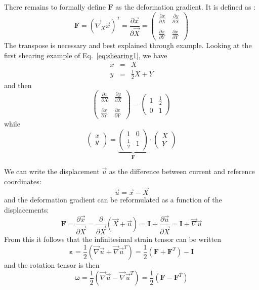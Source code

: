 There remains to formally define ${\bm F}$ as the deformation gradient.
It is defined as :
\[
\boxed{
{\bm F} = (\vec\nabla_X \vec{x})^T
= 
\frac{\partial \vec{x}}{\partial \vec{X}}
=
\left(
\begin{array}{cc}
\frac{\partial x}{\partial X} & 
\frac{\partial y}{\partial X} \\ \\
\frac{\partial x}{\partial Y} & 
\frac{\partial x}{\partial Y}  
\end{array}
\right)
}
\]
The transpose is necessary and best explained through example. 
Looking at the first shearing example of Eq.~\eqref{eq:shearing1}, 
we have
\begin{eqnarray}
x &=& X   \\
y &=& \frac12 X + Y 
\end{eqnarray}
and then
\[
\left(
\begin{array}{cc}
\frac{\partial x}{\partial X} & 
\frac{\partial y}{\partial X} \\ \\
\frac{\partial x}{\partial Y} & 
\frac{\partial x}{\partial Y}  
\end{array}
\right)
=
\left(
\begin{array}{cc}
1 & \frac12 \\ 
0 & 1
\end{array}
\right)
\]
while 
\[
\left(
\begin{array}{c}
x \\ y
\end{array}
\right)
=
\underbrace{
\left(
\begin{array}{cc}
1 & 0 \\
\frac12 & 1
\end{array}
\right)
}_{\bm F}
\cdot
\left(
\begin{array}{c}
X \\ Y
\end{array}
\right)
\]





We can write the displacement $\vec{u}$ as the difference between current and reference coordinates:
\[
\vec{u} = \vec{x}-\vec{X}
\]
and the deformation gradient can be reformulated as a function of the displacements:
\[
{\bm F} 
= \frac{\partial \vec{x}}{\partial \vec{X}} 
= \frac{\partial }{\partial \vec{X}} (\vec{X}+\vec{u})
= {\bm I} + \frac{\partial \vec{u}}{\partial \vec{X}} 
= {\bm I} + \vec{\nabla}\vec{u} 
\]
From this it follows that the infinitesimal strain tensor can be written
\[
\boxed{
{\bm \varepsilon} = \frac{1}{2}( \vec\nabla\vec{u} + \vec\nabla\vec{u}^T )
= \frac{1}{2} (  {\bm F} +  {\bm F}^T) - {\bm I} 
}
\]
and the rotation tensor is then 
\[
{\bm \omega} 
=\frac{1}{2}( \vec\nabla\vec{u} - \vec\nabla\vec{u}^T )
= \frac{1}{2} (  {\bm F} -  {\bm F}^T)
\]







